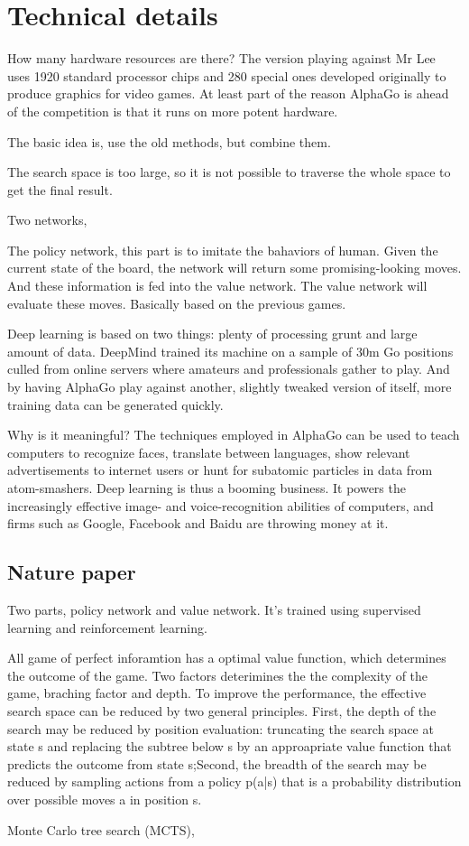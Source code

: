 \section{Technical details}
How many hardware resources are there? The version playing against Mr Lee uses 1920 standard processor chips and 280 special ones developed originally to produce graphics for video games. At least part of the reason AlphaGo is ahead of the competition is that it runs on more potent hardware.

The basic idea is, use the old methods, but combine them. 

The search space is too large, so it is not possible to traverse the whole space to get the final result. 

Two networks, 

The policy network, this part is to imitate the bahaviors of human. Given the current state of the board, the network will return some promising-looking moves. And these information is fed into the value network. The value network will evaluate these moves. Basically based on the previous games.

Deep learning is based on two things: plenty of processing grunt and large amount of data. DeepMind trained its machine on a sample of 30m Go positions culled from online servers where amateurs and professionals gather to play. And by having AlphaGo play against another, slightly tweaked version of itself, more training data can be generated quickly.

Why is it meaningful? The techniques employed in AlphaGo can be used to teach computers to recognize faces, translate between languages, show relevant advertisements to internet users or hunt for subatomic particles in data from atom-smashers. Deep learning is thus a booming business. It powers the increasingly effective image- and voice-recognition abilities of computers, and firms such as Google, Facebook and Baidu are throwing money at it.

\subsection{Nature paper}
Two parts, policy network and value network. It's trained using supervised learning and reinforcement learning.

All game of perfect inforamtion has a optimal value function, which determines the outcome of the game. Two factors deterimines the the complexity of the game, braching factor and depth. To improve the performance, the effective search space can be reduced by two general principles. First, the depth of the search may be reduced by position evaluation: truncating the search space at state s and replacing the subtree below s by an approapriate value function that predicts the outcome from state s;Second, the breadth of the search may be reduced by sampling actions from a policy p(a|s) that is a probability distribution over possible moves a in position s.

Monte Carlo tree search (MCTS), 